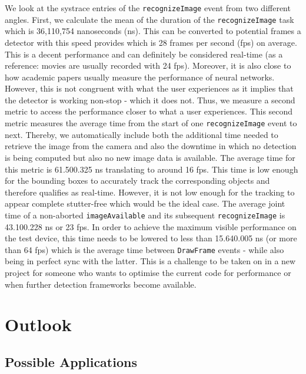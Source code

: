 \documentclass[
			   fontsize=11pt,
               paper=a4,
               bibliography=totoc,
               idxtotoc,
               headsepline,
               footsepline,
               footinclude=false,
               BCOR=12mm,
               DIV=13,
               openany,   %
               ]
               {scrbook}
\newcommand{\code}[1]{\lstinline[basicstyle = \ttfamily\small]{#1}} %
\begin{document}
We look at the systrace entries of the \code{recognizeImage} event from two different angles. First, we calculate the mean of the duration of the \code{recognizeImage} task which is 36,110,754 nanoseconds (ns). This can be converted to potential frames a detector with this speed provides which is 28 frames per second (fps) on average. This is a decent performance and can definitely be considered real-time (as a reference: movies are usually recorded with 24 fps). Moreover, it is also close to how academic papers usually measure the performance of neural networks. However, this is not congruent with what the user experiences as it implies that the detector is working non-stop - which it does not. Thus, we measure a second metric to access the performance closer to what a user experiences. This second metric measures the average time from the start of one \code{recognizeImage} event to next. Thereby, we automatically include both the additional time needed to retrieve the image from the camera and also the downtime in which no detection is being computed but also no new image data is available. The average time for this metric is 61.500.325 ns translating to around 16 fps. This time is low enough for the bounding boxes to accurately track the corresponding objects and therefore qualifies as real-time. However, it is not low enough for the tracking to appear complete stutter-free which would be the ideal case. The average joint time of a non-aborted \code{imageAvailable} and its subsequent \code{recognizeImage} is 43.100.228 ns or 23 fps. In order to achieve the maximum visible performance on the test device, this time needs to be lowered to less than 15.640.005 ns (or more than 64 fps) which is the average time between \code{DrawFrame} events - while also being in perfect sync with the latter. This is a challenge to be taken on in a new project for someone who wants to optimise the current code for performance or when further detection frameworks become available.


\chapter{Outlook}

\section{Possible Applications}
\end{document}
